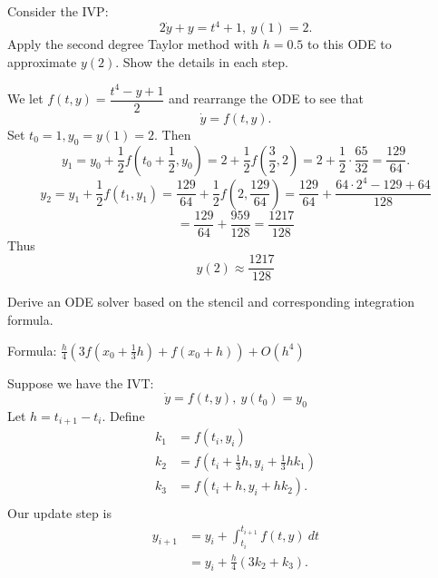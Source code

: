 \documentclass{eh-homework}
\begin{document}
    \begin{question}{4}
        Consider the IVP:
        \[
            2\dot y + y = t^4 + 1,\ y(1) = 2.
        \]
        Apply the second degree Taylor method with \(h = 0.5\) to this ODE to approximate \(y(2)\). Show the details in each step.

        \medskip

        We let \(f(t,y) = \dfrac{t^4 - y + 1}{2}\) and rearrange the ODE to see that
        \[
            \dot y = f(t,y).
        \]
        Set \(t_0 = 1, y_0 = y(1) = 2\). Then
        \[
            y_1 = y_0 + \frac{1}{2} f\left(t_0 + \frac{1}{2}, y_0\right) = 2 + \frac{1}{2} f\left(\frac{3}{2}, 2\right) = 2 + \frac{1}{2}\cdot\frac{65}{32} = \frac{129}{64}.
        \]
        \[
            y_2 = y_1 + \frac{1}{2}f(t_1, y_1) = \frac{129}{64} + \frac{1}{2}f\left(2, \frac{129}{64}\right) = \frac{129}{64} + \frac{64 \cdot 2^4 - 129 + 64}{128}
        \]
        \[
            = \frac{129}{64} + \frac{959}{128} = \frac{1217}{128}
        \]
        Thus
        \[
            y(2) \approx \frac{1217}{128}
        \]
    \end{question}
    \newpage
    \begin{question}{5}
        Derive an ODE solver based on the stencil and corresponding integration formula.

        Formula: \(\frac{h}{4}\left( 3f \left( x_0 + \frac{1}{3}h \right) + f(x_0 + h) \right) + O (h^4)\)

        \medskip

        Suppose we have the IVT:
        \[
            \dot y = f(t,y),\ y(t_0) = y_0
        \]
        Let \(h = t_{i+1} - t_i\). Define
        \begin{align*}
            k_1 &= f(t_i, y_i) \\
            k_2 &= f \left( t_i + \frac{1}{3}h, y_i + \frac{1}{3}hk_1 \right) \\
            k_3 &= f (t_i + h, y_i + hk_2). \\
        \end{align*}
        Our update step is
        \begin{align*}
            y_{i+1} &= y_i + \int _{t_i}^{t_{i+1}}f(t,y)\ dt \\
            &= y_i + \frac{h}{4}(3k_2 + k_3).
        \end{align*}
    \end{question}
\end{document}
